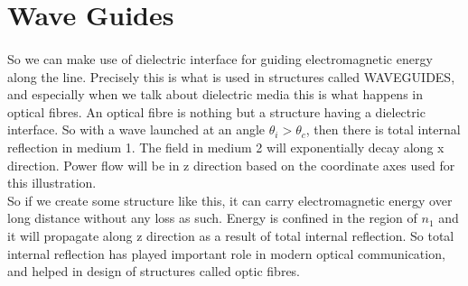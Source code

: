 \section{Wave Guides}
\paragraph{} So we can make use of dielectric interface for guiding electromagnetic energy along the line. Precisely this is what is used in structures called WAVEGUIDES, and especially when we talk about dielectric media this is what happens in optical fibres. An optical fibre is nothing but a structure having a dielectric interface. So with a wave launched at an angle $\theta_i > \theta_c$,
then there is total internal reflection in medium 1. The field in medium 2 will exponentially decay along x direction. Power flow will be in z direction based on the coordinate axes used for this illustration.\\
So if we create some structure like this, it can carry electromagnetic energy over long distance without any loss as such. Energy is confined in the region of $n_1$ and it will propagate along z direction as a result of total internal reflection. So total internal reflection has played important role in modern optical communication, and helped in design of structures called optic fibres. 
